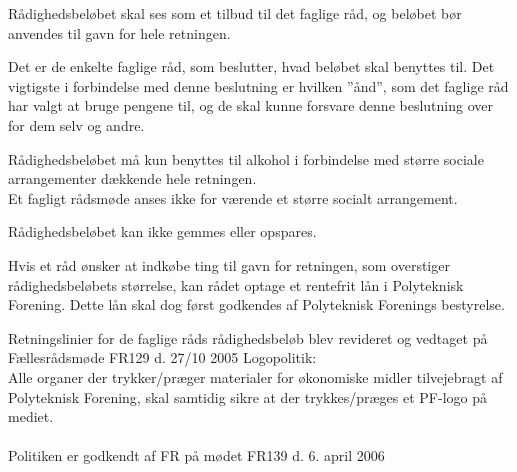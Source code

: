 \begin{list}{•}
\item Rådighedsbeløbet skal ses som et tilbud til det faglige råd, og beløbet bør anvendes til gavn for hele
retningen.
\item Det er de enkelte faglige råd, som beslutter, hvad beløbet skal benyttes til. Det vigtigste i forbindelse med denne beslutning er hvilken ”ånd”, som det faglige råd har valgt at bruge pengene til, og de skal kunne forsvare denne beslutning over for dem selv og andre.
\item Rådighedsbeløbet må kun benyttes til alkohol i forbindelse med større sociale arrangementer dækkende hele retningen.\\
\hspace{20pt} Et fagligt rådsmøde anses ikke for værende et større socialt arrangement.
\item Rådighedsbeløbet kan ikke gemmes eller opspares.
\item Hvis et råd ønsker at indkøbe ting til gavn for retningen, som overstiger rådighedsbeløbets størrelse, kan rådet
optage et rentefrit lån i Polyteknisk Forening. Dette lån skal dog først godkendes af Polyteknisk Forenings
bestyrelse.
\end{list}
Retningslinier for de faglige råds rådighedsbeløb blev revideret og vedtaget på Fællesrådsmøde FR129 d. 27/10 2005
Logopolitik:\\
Alle organer der trykker/præger materialer for økonomiske midler tilvejebragt af Polyteknisk Forening, skal
samtidig sikre at der trykkes/præges et PF-logo på mediet.
\\
\\
Politiken er godkendt af FR på mødet FR139 d. 6. april 2006
